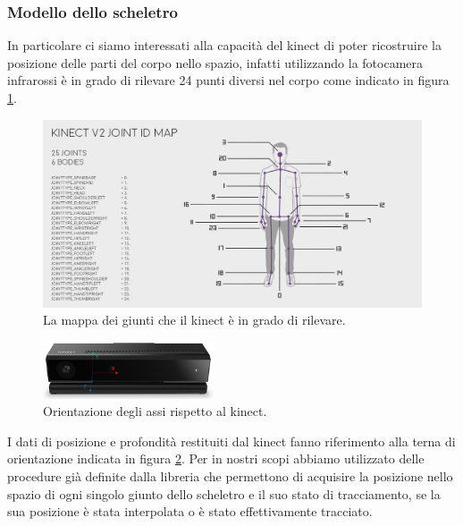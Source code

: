 \documentclass[10pt,a4paper]{article}
\begin{document}
\subsubsection{Modello dello scheletro}
In particolare ci siamo interessati alla capacit\`a del kinect di poter ricostruire la posizione delle parti del corpo nello spazio, infatti utilizzando la fotocamera infrarossi \`e in grado di rilevare 24 punti diversi nel corpo come indicato in figura \ref{fig:kinmap1}.

\begin{figure}[h]
  	\centering
    \includegraphics[width=1\textwidth]{kinectskeletonmap.png}
  	\caption{La mappa dei giunti che il kinect \`e in grado di rilevare.}
  	\label{fig:kinmap1}
\end{figure}

\begin{figure}
	\vspace{-15pt}
  	\centering
   	\includegraphics[width=0.45\textwidth]{kin_axis.png}
  	\vspace{-13pt}
  	\caption{Orientazione degli assi rispetto al kinect.}
  	\label{fig:kinaxis1}
  	\vspace{-15pt}
\end{figure}

I dati di posizione e profondit\`a restituiti dal kinect fanno riferimento alla terna di orientazione indicata in figura \ref{fig:kinaxis1}. Per in nostri scopi abbiamo utilizzato delle procedure gi\`a definite dalla libreria che permettono di acquisire la posizione nello spazio di ogni singolo giunto dello scheletro e il suo stato di tracciamento, se la sua posizione \`e stata interpolata o \`e stato effettivamente tracciato.
\end{document}
